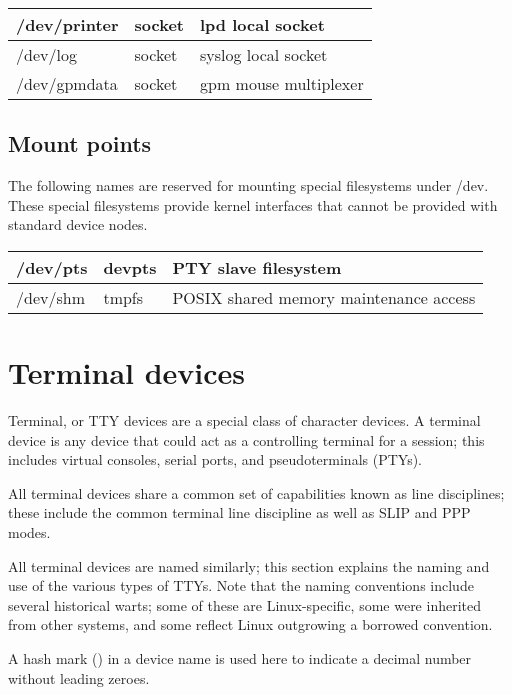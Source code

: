 \documentclass[a4paper,8pt,english]{sphinxmanual}
\begin{document}
\begin{tabulary}{\linewidth}{|L|L|L|}
\hline

/dev/printer
 & 
socket
 & 
lpd local socket
\\
\hline
/dev/log
 & 
socket
 & 
syslog local socket
\\
\hline
/dev/gpmdata
 & 
socket
 & 
gpm mouse multiplexer
\\
\hline\end{tabulary}



\subsection{Mount points}
\label{admin-guide/devices:mount-points}
The following names are reserved for mounting special filesystems
under /dev.  These special filesystems provide kernel interfaces that
cannot be provided with standard device nodes.

\begin{tabulary}{\linewidth}{|L|L|L|}
\hline

/dev/pts
 & 
devpts
 & 
PTY slave filesystem
\\
\hline
/dev/shm
 & 
tmpfs
 & 
POSIX shared memory maintenance access
\\
\hline\end{tabulary}



\section{Terminal devices}
\label{admin-guide/devices:terminal-devices}
Terminal, or TTY devices are a special class of character devices.  A
terminal device is any device that could act as a controlling terminal
for a session; this includes virtual consoles, serial ports, and
pseudoterminals (PTYs).

All terminal devices share a common set of capabilities known as line
disciplines; these include the common terminal line discipline as well
as SLIP and PPP modes.

All terminal devices are named similarly; this section explains the
naming and use of the various types of TTYs.  Note that the naming
conventions include several historical warts; some of these are
Linux-specific, some were inherited from other systems, and some
reflect Linux outgrowing a borrowed convention.

A hash mark (\code{\#}) in a device name is used here to indicate a decimal
number without leading zeroes.
\end{document}
